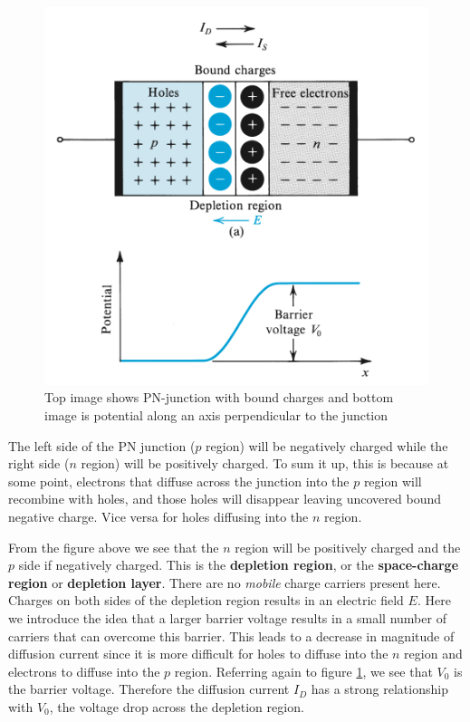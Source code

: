 \begin{figure}[htb]
    \centering
    \includegraphics[scale=0.5]{figs/ch03/uncovered_region.png}
    \caption{Top image shows PN-junction with bound charges and bottom image is potential along an axis perpendicular to the junction}
    \label{fig:barrier-voltage1}
\end{figure}

The left side of the PN junction ($p$ region) will be negatively charged while the right side ($n$ region) will be positively charged. To sum it up, this is because at some point, electrons that diffuse across the junction into the $p$ region will recombine with holes, and those holes will disappear leaving uncovered bound negative charge. Vice versa for holes diffusing into the $n$ region. 

From the figure above we see that the $n$ region will be positively charged and the $p$ side if negatively charged. This is the \textbf{depletion region}, or the \textbf{space-charge region} or \textbf{depletion layer}. There are no \textit{mobile} charge carriers present here. Charges on both sides of the depletion region results in an electric field $E$. Here we introduce the idea that a larger barrier voltage results in a small number of carriers that can overcome this barrier. This leads to a decrease in magnitude of diffusion current since it is more difficult for holes to diffuse into the $n$ region and electrons to diffuse into the $p$ region. Referring again to figure \ref{fig:barrier-voltage1}, we see that $V_0$ is the barrier voltage. Therefore the diffusion current $I_D$ has a strong relationship with $V_0$, the voltage drop across the depletion region.

